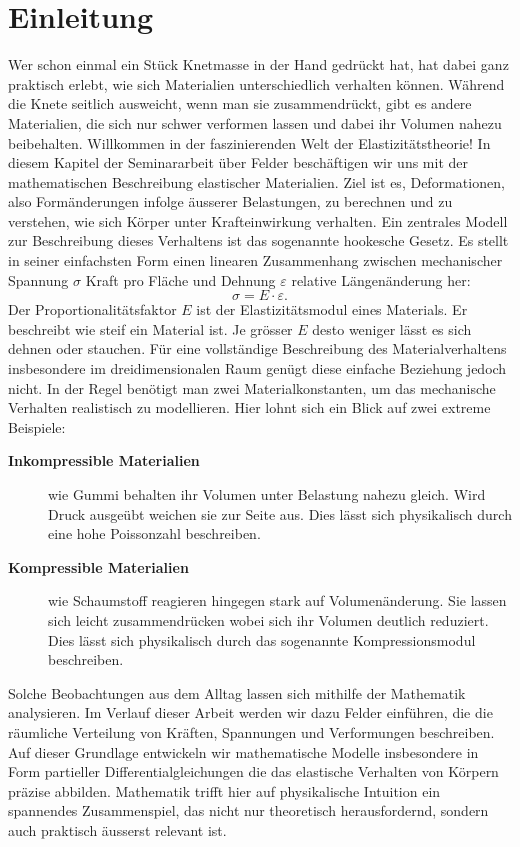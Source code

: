 %
%
%
%
\section{Einleitung}
\label{elastomechanik:section:Einleitung}
Wer schon einmal ein Stück Knetmasse in der Hand gedrückt hat, hat dabei ganz praktisch erlebt, wie sich Materialien unterschiedlich verhalten können. 
Während die Knete seitlich ausweicht, wenn man sie zusammendrückt,
gibt es andere Materialien, die sich nur schwer verformen lassen und
dabei ihr Volumen nahezu beibehalten.
Willkommen in der faszinierenden Welt der Elastizitätstheorie!
In diesem Kapitel der Seminararbeit über Felder beschäftigen wir uns mit der mathematischen Beschreibung elastischer Materialien.
Ziel ist es, Deformationen, also Formänderungen infolge äusserer Belastungen,
zu berechnen und zu verstehen, wie sich Körper unter Krafteinwirkung verhalten.
Ein zentrales Modell zur Beschreibung dieses Verhaltens ist das sogenannte
hookesche Gesetz.
Es stellt in seiner einfachsten Form einen linearen Zusammenhang zwischen mechanischer Spannung $\sigma$ Kraft pro Fläche und Dehnung $\varepsilon$ relative Längenänderung her:
	\begin{equation*}
		\sigma = 
		E \cdot \varepsilon.
	\end{equation*}
Der Proportionalitätsfaktor $E$ ist der Elastizitätsmodul eines Materials.
Er beschreibt wie steif ein Material ist.
Je grösser $E$ desto weniger lässt es sich dehnen oder stauchen.
Für eine vollständige Beschreibung des Materialverhaltens insbesondere im dreidimensionalen Raum genügt diese einfache Beziehung jedoch nicht.
In der Regel benötigt man zwei Materialkonstanten,
um das mechanische Verhalten realistisch zu modellieren.
Hier lohnt sich ein Blick auf zwei extreme Beispiele:
\begin{description}
\item[\textbf{Inkompressible Materialien}] wie Gummi behalten ihr Volumen unter Belastung nahezu gleich.
Wird Druck ausgeübt weichen sie zur Seite aus.
Dies lässt sich physikalisch durch eine hohe Poissonzahl beschreiben.
\item[\textbf{Kompressible Materialien}] wie Schaumstoff reagieren hingegen stark auf Volumenänderung.
Sie lassen sich leicht zusammendrücken wobei sich ihr Volumen deutlich reduziert.
Dies lässt sich physikalisch durch das sogenannte Kompressionsmodul beschreiben.
\end{description}

Solche Beobachtungen aus dem Alltag lassen sich mithilfe der Mathematik analysieren.
Im Verlauf dieser Arbeit werden wir dazu Felder einführen, die die
räumliche Verteilung von Kräften, Spannungen und Verformungen beschreiben.
Auf dieser Grundlage entwickeln wir mathematische Modelle insbesondere
in Form partieller Differentialgleichungen die das elastische Verhalten
von Körpern präzise abbilden.
Mathematik trifft hier auf physikalische Intuition ein spannendes
Zusammenspiel, das nicht nur theoretisch herausfordernd, sondern auch
praktisch äusserst relevant ist.
